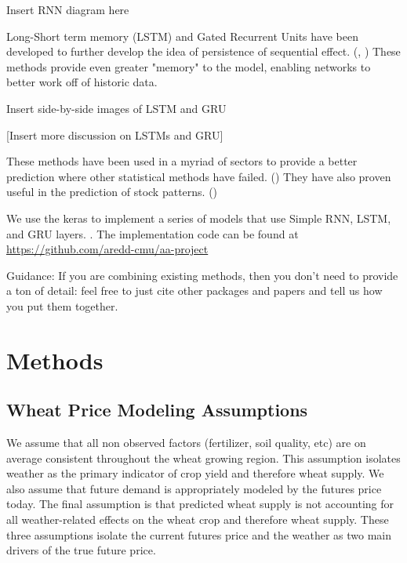 \documentclass[twoside,11pt]{article}
\begin{document}
Insert RNN diagram here

Long-Short term memory (LSTM) and Gated Recurrent Units have been developed to further develop the idea of persistence of sequential effect. (\cite{Hochreiter1997}, \cite{Chung}) These methods provide even greater "memory" to the model, enabling networks to better work off of historic data. 

Insert side-by-side images of LSTM and GRU

[Insert more discussion on LSTMs and GRU]

These methods have been used in a myriad of sectors to provide a better prediction where other statistical methods have failed. (\cite{Ugurlu2018}) They have also proven useful in the prediction of stock patterns. (\cite{YoungohcYoon}) 

We use the keras to implement a series of models that use Simple RNN, LSTM, and GRU layers. \cite{chollet2015keras}. The implementation code can be found at \url{https://github.com/aredd-cmu/aa-project}


Guidance:
If you are combining existing methods, then you don't need to provide a ton of detail: feel free to just cite other packages and papers and tell us how you put them together.

\section{Methods} \label{Methods}

\subsection{Wheat Price Modeling Assumptions}
We assume that all non observed factors (fertilizer, soil quality, etc) are on average consistent throughout the wheat growing region. This assumption isolates weather as the primary indicator of crop yield and therefore wheat supply. We also assume that future demand is appropriately modeled by the futures price today. The final assumption is that predicted wheat supply is not accounting for all weather-related effects on the wheat crop and therefore wheat supply. These three assumptions isolate the current futures price and the weather as two main drivers of the true future price. 
\end{document}
